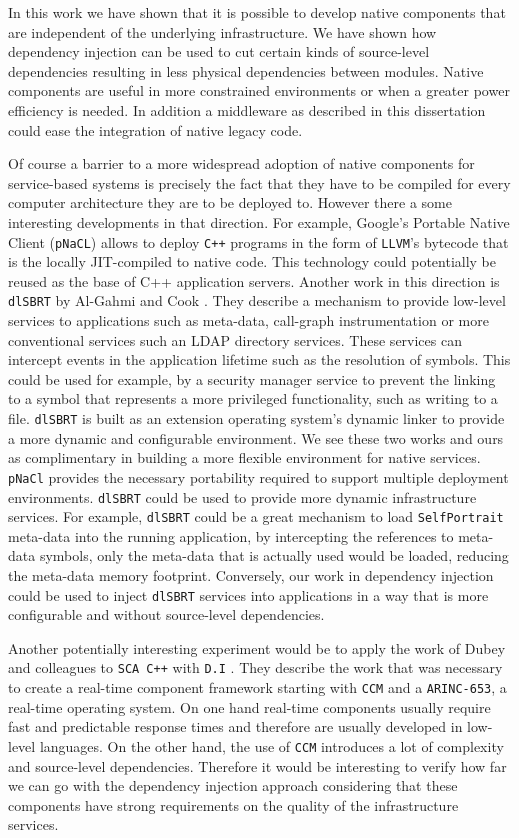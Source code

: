 In this work we have shown that it is possible to develop native components that are independent of the
underlying infrastructure. We have shown how dependency injection can be used to cut certain kinds
of source-level dependencies resulting in less physical dependencies between modules. Native components
are useful in more constrained environments or when a greater power efficiency is needed. In addition
a middleware as described in this dissertation could ease the integration of native legacy code.

Of course a barrier to a more widespread adoption of native components for service-based systems is precisely
the fact that they have to be compiled for every computer architecture they are to be deployed to. However
there a some interesting developments in that direction. For example, Google's Portable Native Client (\texttt{pNaCL}) \cite{pNaCl}
allows to deploy \texttt{C++} programs in the form of \texttt{LLVM}'s bytecode that is the locally JIT-compiled to native code.
This technology could potentially be reused as the base of C++ application servers. Another work in this
direction is \texttt{dlSBRT} by Al-Gahmi and Cook \cite{Al-Gahmi}. They describe a mechanism to provide low-level services
to applications such as meta-data, call-graph instrumentation or more conventional services such an LDAP
directory services. These services can intercept events in the application lifetime such as the resolution of
symbols. This could be used for example, by a security manager service to prevent the linking to a symbol
that represents a more privileged functionality, such as writing to a file. \texttt{dlSBRT} is built as an extension
operating system's dynamic linker to provide a more dynamic and configurable environment.
We see these two works and ours as complimentary in building a more flexible environment for native services.
\texttt{pNaCl} provides the necessary portability required to support multiple deployment environments. \texttt{dlSBRT} could
be used to provide more dynamic infrastructure services. For example, \texttt{dlSBRT} could be a great mechanism to load
\texttt{SelfPortrait} meta-data into the running application, by intercepting the references to meta-data symbols, only
the meta-data that is actually used would be loaded, reducing the meta-data memory footprint. Conversely, our
work in dependency injection could be used to inject \texttt{dlSBRT} services into applications in a way that is more
configurable and without source-level dependencies.

Another potentially interesting experiment would be to apply the work of Dubey and colleagues to \texttt{SCA C++} with \texttt{D.I} \cite{Dubey}.
They describe the work that was necessary to create a real-time component framework starting with \texttt{CCM} and a \texttt{ARINC-653},
a real-time operating system. On one hand real-time components usually require fast and predictable response times and therefore
are usually developed in low-level languages. On the other hand, the use of \texttt{CCM} introduces a lot of complexity and source-level
dependencies. Therefore it would be interesting to verify how far we can go with the dependency injection approach considering
that these components have strong requirements on the quality of the infrastructure services.

